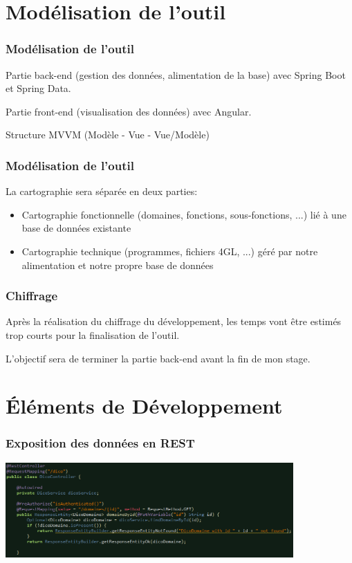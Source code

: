 \documentclass{beamer}
\begin{document}
\section[Modélisation]{Modélisation de l'outil}

\begin{frame}
\frametitle{Modélisation de l'outil}

Partie back-end (gestion des données, alimentation de la base) avec Spring Boot et Spring Data. 

\bigbreak

Partie front-end (visualisation des données) avec Angular.

\bigbreak

Structure MVVM (Modèle - Vue - Vue/Modèle)

\end{frame}

\begin{frame}
\frametitle{Modélisation de l'outil}

La cartographie sera séparée en deux parties:

\begin{itemize}
	\item Cartographie fonctionnelle (domaines, fonctions, sous-fonctions, ...) lié à une base de données existante
	\item Cartographie technique (programmes, fichiers 4GL, ...) géré par notre alimentation et notre propre base de données
\end{itemize}

\end{frame}

\begin{frame}
\frametitle{Chiffrage}

Après la réalisation du chiffrage du développement, les temps vont être estimés trop courts pour la finalisation de l'outil.

\bigbreak

L'objectif sera de terminer la partie back-end avant la fin de mon stage.

\end{frame}

\section[Développement]{Éléments de Développement}

\begin{frame}
\frametitle{Exposition des données en REST}

\begin{center}
	\includegraphics[width=11cm]{images/restController}
\end{center}

\end{frame}
\end{document}
